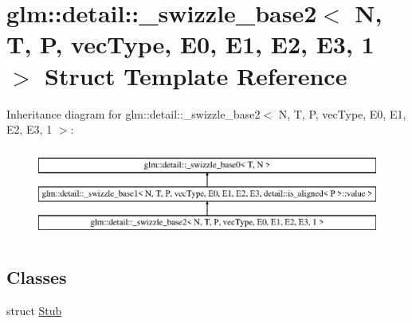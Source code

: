 \hypertarget{structglm_1_1detail_1_1__swizzle__base2_3_01N_00_01T_00_01P_00_01vecType_00_01E0_00_01E1_00_01E2_00_01E3_00_011_01_4}{}\section{glm\+:\+:detail\+:\+:\+\_\+swizzle\+\_\+base2$<$ N, T, P, vec\+Type, E0, E1, E2, E3, 1 $>$ Struct Template Reference}
\label{structglm_1_1detail_1_1__swizzle__base2_3_01N_00_01T_00_01P_00_01vecType_00_01E0_00_01E1_00_01E2_00_01E3_00_011_01_4}
Inheritance diagram for glm\+:\+:detail\+:\+:\+\_\+swizzle\+\_\+base2$<$ N, T, P, vec\+Type, E0, E1, E2, E3, 1 $>$\+:\begin{figure}[H]
\begin{center}
\leavevmode
\includegraphics[height=3.000000cm]{structglm_1_1detail_1_1__swizzle__base2_3_01N_00_01T_00_01P_00_01vecType_00_01E0_00_01E1_00_01E2_00_01E3_00_011_01_4}
\end{center}
\end{figure}
\subsection*{Classes}
\begin{DoxyCompactItemize}
\item 
struct \hyperlink{structglm_1_1detail_1_1__swizzle__base2_3_01N_00_01T_00_01P_00_01vecType_00_01E0_00_01E1_00_01E2_00_01E3_00_011_01_4_1_1Stub}{Stub}
\end{DoxyCompactItemize}
